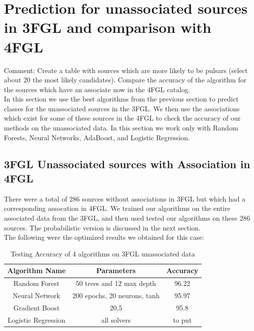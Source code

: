 \section{Prediction for unassociated sources in 3FGL and comparison with 4FGL}




Comment: Create a table with sources which are more likely to be pulsars (select about 20 the most likely candidates).
Compare the accuracy of the algorithm for the sources which have an associate now in the 4FGL catalog.\\

In this section we use the best algorithms from the previous section to predict classes for the unassociated sources in the 3FGL. We then use the associations which exist for some of these sources in the 4FGL to check the accuracy of our methods on the unassociated data. In this section we work only with Random Forests, Neural Networks, AdaBoost, and Logistic Regression. \\


\subsection{3FGL Unassociated sources with Association in 4FGL}
There were a total of 286 sources without associations in 3FGL but which had a corresponding assocation in 4FGL. We trained our algorithms on the entire associated data from the 3FGL, and then used tested our algorithms on these 286 sources. The probabilistic version is discussed in the next section.  \\

The following were the optimized results we obtained for this case:\\

\begin{table}[!h]
    \tiny
    \centering
    \renewcommand{\tabcolsep}{1mm}
\renewcommand{\arraystretch}{1.5}

    \begin{tabular}{|c|c|c|}
    \hline
    Algorithm Name&Parameters & Accuracy\\
    \hline
    Random Forest& 50 trees and 12 max depth & 96.22   \\
    \hline
    Neural Network & 200 epochs, 20 neurons, tanh     &  95.97 \\
    \hline %
    Gradient Boost& 20,5    &   95.8  \\
    \hline %
    Logistic Regression& all solvers &to put  \\
    \hline
     
    \end{tabular}

    \caption{Testing Accuracy of 4 algorithms on 3FGL unassociated data}
    \label{tab:my_labe2l}
\end{table}


